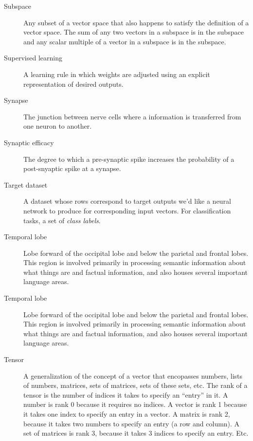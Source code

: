 \begin{description}
\item[Subspace] Any subset of a vector space that also happens to satisfy the definition of a vector space. The sum of any two vectors in a subspace is in the subspace and any scalar multiple of a vector in a subspace is in the subspace.

\item[Supervised learning] A learning rule in which weights are adjusted using an explicit representation of desired outputs.


\item[Synapse] The junction between nerve cells where a information is transferred from one neuron to another.

\item[Synaptic efficacy] The degree to which a pre-synaptic spike increases the probability of a post-snyaptic spike at a synapse.

\item[Target dataset] A dataset whose rows correspond to target outputs we'd like a neural network to produce for corresponding input vectors. For classification tasks, a set of \emph{class labels}.

\item[Temporal lobe] Lobe forward of the occipital lobe and below the parietal and frontal lobes. This region is involved primarily in processing semantic information about what things are and factual information, and also houses several important language areas.

\item[Temporal lobe] Lobe forward of the occipital lobe and below the parietal and frontal lobes. This region is involved primarily in processing semantic information about what things are and factual information, and also houses several important language areas.

\item[Tensor] A generalization of the concept of a vector that encopasses numbers, lists of numbers, matrices, sets of matrices, sets of these sets, etc. The rank of a  tensor is the number of indices it takes to specify an ``entry'' in it.  A number is rank 0 because it requires no indices. A vector is rank 1 because it takes one index to specify an entry in a vector. A matrix is rank 2, because it takes two numbers to specify an entry (a row and column). A set of matrices is rank 3, because it takes 3 indices to specify an entry. Etc.


\end{description}
